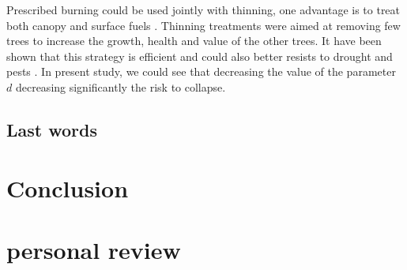 \documentclass{article}
\begin{document}
Prescribed burning could be used jointly with thinning, one advantage is to treat both canopy and surface fuels \citep{kalies_tamm_2016, agee_basic_2005}. Thinning treatments were aimed at removing few trees to increase the growth, health and value of the other trees. It have been shown that this strategy is efficient \citep{hurteau2008carbon} and could also better resists to drought \citep{d2013effects} and pests \citep{waring2005silvicultural}. In present study, we could see that decreasing the value of the parameter $d$ decreasing significantly the risk to collapse.




\subsection{Last words}

\todo{}






\newpage

\section*{Conclusion}







\newpage

\section*{personal review}
\end{document}
